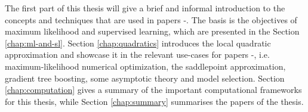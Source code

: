 The first part of this thesis will give a brief and informal introduction to the concepts and techniques that are used in papers -.
The basis is the objectives of maximum likelihood and supervised learning, which are presented in the Section \ref{chap:ml-and-sl}.
Section \ref{chap:quadratics} introduces the local quadratic approximation and showcase it in the relevant use-cases for papers -, i.e. maximum-likelihood numerical optimization, the saddlepoint approximation, gradient tree boosting, some asymptotic theory and model selection.
Section \ref{chap:computation} gives a summary of the important computational frameworks for this thesis, while Section \ref{chap:summary} summarises the papers of the thesis.
%
%
%
%
%
%
%
%
%
%
%







